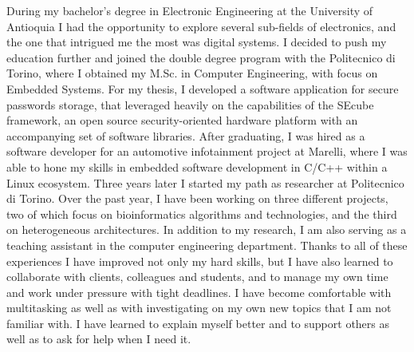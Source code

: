 During my bachelor's degree in Electronic Engineering at the University of Antioquia I had the opportunity to explore several sub-fields of electronics, and the one that intrigued me the most was digital systems. I decided to push my education further and joined the double degree program with the Politecnico di Torino, where I obtained my M.Sc. in Computer Engineering, with focus on Embedded Systems.
For my thesis, I developed a software application for secure passwords storage, that leveraged heavily on the capabilities of the SEcube framework, an open source security-oriented hardware platform with an accompanying set of software libraries.
After graduating, I was hired as a software developer for an automotive infotainment project at Marelli, where I was able to hone my skills in embedded software development in C/C++ within a Linux ecosystem.
Three years later I started my path as researcher at Politecnico di Torino. Over the past year, I have been working on three different projects, two of which focus on bioinformatics algorithms and technologies, and the third on heterogeneous architectures. In addition to my research, I am also serving as a teaching assistant in the computer engineering department.
Thanks to all of these experiences I have improved not only my hard skills, but I have also learned to collaborate with clients, colleagues and students, and to manage my own time and work under pressure with tight deadlines. I have become comfortable with multitasking as well as with investigating on my own new topics that I am not familiar with. I have learned to explain myself better and to support others as well as to ask for help when I need it.
